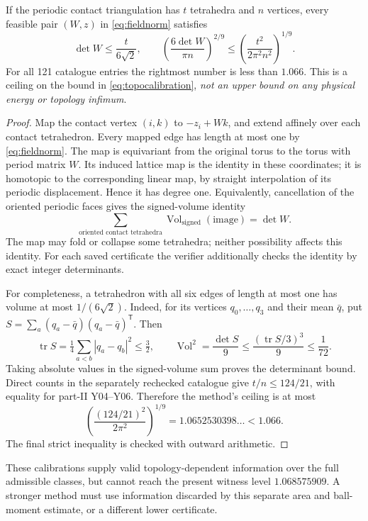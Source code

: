 \documentclass[11pt,a4paper]{report}
\begin{document}
\begin{proposition}\label{prop:calibrationceiling}
If the periodic contact triangulation has $t$ tetrahedra and $n$ vertices,
every feasible pair $(W,z)$ in \eqref{eq:fieldnorm} satisfies
\[
 \det W\leq\frac{t}{6\sqrt2},\qquad
 \left(\frac{6\det W}{\pi n}\right)^{2/9}
 \leq\left(\frac{t^2}{2\pi^2 n^2}\right)^{1/9}.
\]
For all 121 catalogue entries the rightmost number is less than $1.066$.
This is a ceiling on the bound in \eqref{eq:topocalibration},
\emph{not an upper bound on any physical energy or topology infimum}.
\end{proposition}
\begin{proof}
Map the contact vertex $(i,k)$ to $-z_i+Wk$, and extend affinely over
each contact tetrahedron. Every mapped edge has length at most one by
\eqref{eq:fieldnorm}. The map is equivariant from the original torus to
the torus with period matrix $W$. Its induced lattice map is the identity
in these coordinates; it is homotopic to the corresponding linear map,
by straight interpolation of its periodic displacement. Hence it has
degree one. Equivalently, cancellation of the oriented periodic faces
gives the signed-volume identity
\[
 \sum_{\text{oriented contact tetrahedra}}
      \operatorname{Vol}_{\mathrm{signed}}(\text{image})=\det W.
\]
The map may fold or collapse some tetrahedra; neither possibility affects
this identity. For each saved certificate the verifier additionally
checks the identity by exact integer determinants.

For completeness, a tetrahedron with all six edges of length at most one
has volume at most $1/(6\sqrt2)$. Indeed, for its vertices $q_0,\ldots,q_3$
and their mean $\bar q$, put
$S=\sum_a(q_a-\bar q)(q_a-\bar q)^{\mathsf T}$. Then
\[
 \operatorname{tr}S=\tfrac14\sum_{a<b}|q_a-q_b|^2\leq\tfrac32,
 \qquad \operatorname{Vol}^2=\frac{\det S}{9}
 \leq\frac{(\operatorname{tr}S/3)^3}{9}\leq\frac1{72}.
\]
Taking absolute values in the signed-volume sum proves the determinant
bound. Direct counts in the separately rechecked catalogue give
$t/n\leq124/21$, with equality for part-II Y04--Y06. Therefore the
method's ceiling is at most
\[
 \left(\frac{(124/21)^2}{2\pi^2}\right)^{1/9}
 =1.0652530398\ldots<1.066.
\]
The final strict inequality is checked with outward arithmetic.
\end{proof}

These calibrations supply valid topology-dependent information over the
full admissible classes, but cannot reach the present witness level
$1.068575909$. A stronger method must use information discarded by this
separate area and ball-moment estimate, or a different lower certificate.
\end{document}
